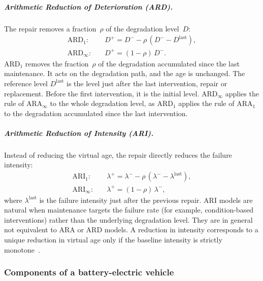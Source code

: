 \documentclass[11pt,a4paper]{article}
\theoremstyle{plain}
\theoremstyle{definition}
\theoremstyle{remark}
\begin{document}
\subparagraph{Arithmetic Reduction of Deterioration (ARD).}
The repair removes a fraction~$\rho$ of the degradation level~$D$:
\begin{align}
  \text{ARD}_1: &\quad D^+ = D^- - \rho\,(D^- - D^{\mathrm{last}}), \label{eq:ard1} \\
  \text{ARD}_\infty: &\quad D^+ = (1-\rho)\,D^-. \label{eq:ardinf}
\end{align}
$\text{ARD}_1$ removes the fraction~$\rho$ of the degradation accumulated since the last maintenance.
It acts on the degradation path, and the age is unchanged.
The reference level $D^{\mathrm{last}}$ is the level just after the last intervention, repair or replacement.
Before the first intervention, it is the initial level.
$\text{ARD}_\infty$ applies the rule of $\text{ARA}_\infty$ to the whole degradation level, as $\text{ARD}_1$ applies the rule of $\text{ARA}_1$ to the degradation accumulated since the last intervention.

\subparagraph{Arithmetic Reduction of Intensity (ARI).}
Instead of reducing the virtual age, the repair directly reduces the failure intensity:
\begin{align}
  \text{ARI}_1: &\quad \lambda^+ = \lambda^- - \rho\,(\lambda^- - \lambda^{\mathrm{last}}), \label{eq:ari1} \\
  \text{ARI}_\infty: &\quad \lambda^+ = (1-\rho)\,\lambda^-, \label{eq:ariinf}
\end{align}
where $\lambda^{\mathrm{last}}$ is the failure intensity just after the previous repair.
ARI models are natural when maintenance targets the failure rate (for example, condition-based interventions) rather than the underlying degradation level.
They are in general not equivalent to ARA or ARD models.
A reduction in intensity corresponds to a unique reduction in virtual age only if the baseline intensity is strictly monotone~\cite{DoyenGaudoin2004}.

\subsubsection{Components of a battery-electric vehicle}
\label{sec:ev_focus}
\end{document}
